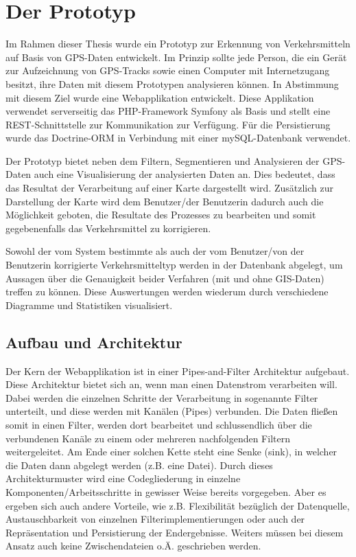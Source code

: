 \chapter{Der Prototyp}

Im Rahmen dieser Thesis  wurde ein Prototyp zur Erkennung von Verkehrsmitteln auf Basis von GPS-Daten entwickelt. Im Prinzip sollte jede Person, die ein Gerät zur Aufzeichnung von GPS-Tracks sowie einen Computer mit Internetzugang besitzt, ihre Daten mit diesem Prototypen analysieren können. In Abstimmung mit diesem Ziel wurde eine Webapplikation entwickelt. Diese Applikation verwendet serverseitig das PHP-Framework Symfony als Basis und stellt eine REST-Schnittstelle zur Kommunikation zur Verfügung. Für die Persistierung wurde das Doctrine-ORM in Verbindung mit einer mySQL-Datenbank verwendet.

Der Prototyp bietet neben dem Filtern, Segmentieren und Analysieren der GPS-Daten auch eine Visualisierung der analysierten Daten an. Dies bedeutet, dass das Resultat der Verarbeitung auf einer Karte dargestellt wird. Zusätzlich zur Darstellung der Karte wird dem Benutzer/der Benutzerin dadurch auch die Möglichkeit geboten, die Resultate des Prozesses zu bearbeiten und somit gegebenenfalls das Verkehrsmittel zu korrigieren. 

Sowohl der vom System bestimmte als auch der vom Benutzer/von der Benutzerin korrigierte Verkehrsmitteltyp werden in der Datenbank abgelegt, um Aussagen über die Genauigkeit beider Verfahren (mit und ohne GIS-Daten) treffen zu können. Diese Auswertungen werden wiederum durch verschiedene Diagramme und Statistiken visualisiert.

\section{Aufbau und Architektur}
Der Kern der Webapplikation ist in einer Pipes-and-Filter Architektur aufgebaut. Diese Architektur bietet sich an, wenn man einen Datenstrom verarbeiten will. Dabei werden die einzelnen Schritte der Verarbeitung in sogenannte Filter unterteilt, und diese werden mit Kanälen (Pipes) verbunden. Die Daten fließen somit in einen Filter, werden dort bearbeitet und schlussendlich über die verbundenen Kanäle zu einem oder mehreren nachfolgenden Filtern weitergeleitet. Am Ende einer solchen Kette steht eine Senke (sink), in welcher die Daten dann abgelegt werden (z.B. eine Datei). Durch dieses Architekturmuster wird eine Codegliederung in einzelne Komponenten/Arbeitsschritte in gewisser Weise bereits vorgegeben. Aber es ergeben sich auch andere Vorteile, wie z.B. Flexibilität bezüglich der Datenquelle, Austauschbarkeit von einzelnen Filterimplementierungen oder auch der Repräsentation und Persistierung der Endergebnisse. Weiters müssen bei diesem Ansatz auch keine Zwischendateien o.Ä. geschrieben werden. \cite{buschmann_pipes_1998}

